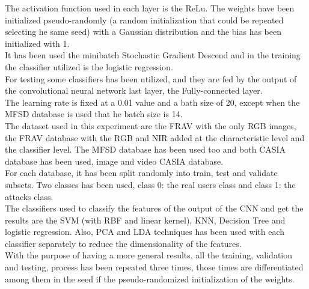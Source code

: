 The activation function used in each layer is the ReLu. The weights have been initialized pseudo-randomly (a random initialization that could be repeated selecting he same seed) with a Gaussian distribution and the bias has been initialized with 1.\\

It has been used the minibatch Stochastic Gradient Descend and in the training the classifier utilized is the logistic regression.\\

For testing some classifiers has been utilized, and they are fed by the output of the convolutional neural network last layer, the Fully-connected layer.\\

The learning rate is fixed at a 0.01 value and a bath size of 20, except when the MFSD database is used that he batch size is 14.\\

The dataset used in this experiment are the FRAV with the only RGB images, the FRAV database with the RGB and NIR added at the characteristic level  and  the classifier level. The MFSD database has been used too and both CASIA database has been used, image and video CASIA database.\\

For each database, it has been split randomly into train, test and validate subsets. Two classes has been used, class 0: the real users class and class 1: the attacks class.\\

The classifiers used to classify the features of the output of the CNN and get the results are the SVM (with RBF and linear kernel), KNN, Decision Tree and logistic regression. Also, PCA and LDA techniques has been used with each classifier separately to reduce the dimensionality of the features.\\

With the purpose of having a more general results, all the training, validation and testing, process has been repeated three times, those times are differentiated among them in the seed if the pseudo-randomized initialization of the weights.\\
